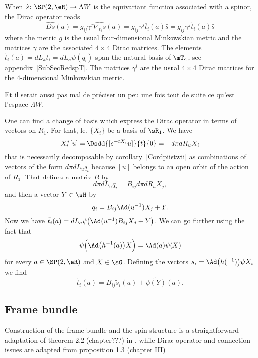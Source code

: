 When $\hat{s}\colon \SP(2,\eR) \to \Lambda W$ is the equivariant function associated with a spinor, the Dirac operator reads
\begin{equation}        \label{EqDiracAdsquatre}
	\widehat{Ds}(a)=g_{ij}\gamma^j\widehat{\nabla_{t_i}s}(a)
	=g_{ij}\gamma^j\overline{ t }_i(a)\hat{s}
	=g_{ij}\gamma^j\tilde t_i(a)\hat{s}
\end{equation}
where the metric $g$ is the usual four-dimensional Minkowskian metric and the matrices $\gamma$ are the associated $4\times 4$ Dirac matrices. The elements $\tilde t_i(a)=dL_at_i=dL_a\psi(q_i)$ span the natural basis of $\mT_a$, see appendix~\ref{SubSecRedspT}. The matrices $\gamma^i$ are the usual $4\times 4$ Dirac matrices for the $4$-dimensional Minkowskian metric.

\begin{probleme}
	Et il serait aussi pas mal de préciser un peu une fois tout de suite ce qu'est l'espace $\Lambda W$.
\end{probleme}

One can find a change of basis which express the Dirac operator in terms of vectors on $R_1$. For that, let $\{ X_i \}$ be a basis of $\sR_1$. We have
\[
	X^*_i[u]=\Dsdd{ [ e^{-tX_i}u] }{t}{0}=-d\pi dR_uX_i
\]
that is necessarily decomposable by corollary~\ref{Cordpiietwii} as combinations of vectors of the form $d\pi dL_uq_i$ because $[u]$ belongs to an open orbit of the action of $R_1$. That defines a matrix $B$ by
\[
	d\pi dL_uq_i=B_{ij}d\pi dR_uX_j,
\]
and then a vector $Y\in \sH$ by
\begin{equation}
	q_i=B_{ij}\Ad(u^{-1})X_j+Y.
\end{equation}
Now we have $\tilde t_i(a)=dL_a\psi\big( \Ad(u^{-1})B_{ij}X_j+Y \big)$. We can go further using the fact that
\begin{equation}
	\psi\Big( \Ad\big( h^{-1}(a) \big)X \Big)=\Ad(a)\psi(X)
\end{equation}
for every $a\in\SP(2,\eR)$ and $X\in\sG$. Defining the vectors $s_i=\Ad\big( h(^{-1}) \big)\psi X_i$ we find
\begin{equation}
	\tilde t_i(a)=B_{ij}\tilde s_i(a)+\widetilde{\psi(Y)}(a).
\end{equation}

\subsection{Frame bundle}

Construction of the frame bundle and the spin structure is a straightforward adaptation of theorem 2.2 (chapter???) in \cite{AnnikFranc}, while Dirac operator and connection issues are adapted from proposition 1.3 (chapter III)

